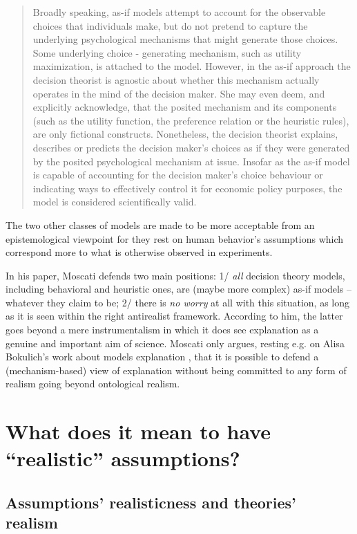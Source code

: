\documentclass[a4paper,11pt]{article}
\begin{document}
\begin{quote}
Broadly speaking, as-if models attempt to account for the observable choices that
individuals make, but do not pretend to capture the underlying psychological
mechanisms that might generate those choices. Some underlying choice -
generating mechanism, such as utility maximization, is attached to the model.
However, in the as-if approach the decision theorist is agnostic about whether
this mechanism actually operates in the mind of the decision maker. She may
even deem, and explicitly acknowledge, that the posited mechanism and its
components (such as the utility function, the preference relation or the heuristic
rules), are only fictional constructs. Nonetheless, the decision theorist explains,
describes or predicts the decision maker’s choices as if they were generated by
the posited psychological mechanism at issue. Insofar as the as-if model is
capable of accounting for the decision maker’s choice behaviour or indicating ways to effectively control it for economic policy purposes, the model is considered
scientifically valid.
\end{quote}


The two other classes of models are made to be more acceptable from an epistemological viewpoint for they rest on human behavior's assumptions which correspond more to what is otherwise observed in experiments.

In his paper, Moscati defends two main positions: 1/ \textit{all} decision theory models, including behavioral and heuristic ones, are (maybe more complex) as-if models -- whatever they claim to be; 2/ there is \textit{no worry} at all with this situation, as long as it is seen within the right antirealist framework. According to him, the latter goes beyond a mere instrumentalism in which it does see explanation as a genuine and important aim of science. Moscati only argues, resting e.g. on Alisa Bokulich's work about models explanation \citep{Bokulich2009}, that it is possible to defend a (mechanism-based) view of explanation without being committed to any form of realism going beyond ontological realism. 

\section{What does it mean to have ``realistic'' assumptions?}
\subsection{Assumptions' realisticness and theories' realism}
\end{document}
